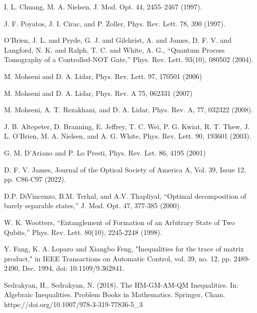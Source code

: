 \documentclass[a4paper, amsfonts, amssymb, amsmath, reprint, showkeys, nofootinbib, twoside]{revtex4-1}
\begin{document}
\begin{thebibliography}{}
I. L. Chuang, M. A. Nielsen, J. Mod. Opt. 44, 2455–2467 (1997).

J. F. Poyatos, J. I. Cirac, and P. Zoller, Phys. Rev. Lett. 78, 390 (1997).

O'Brien, J. L. and Pryde, G. J. and Gilchrist, A. and James, D. F. V. and Langford, N. K. and Ralph, T. C. and White, A. G., “Quantum Process Tomography of a Controlled-NOT Gate,” Phys. Rev. Lett. 93(10), 080502 (2004).

M. Mohseni and D. A. Lidar, Phys. Rev. Lett. 97, 170501
(2006)

M. Mohseni and D. A. Lidar, Phys. Rev. A 75, 062331 (2007)

M. Mohseni, A. T. Rezakhani, and D. A. Lidar, Phys. Rev. A, 77, 032322 (2008).

J. B. Altepeter, D. Branning, E. Jeffrey, T. C. Wei, P. G. Kwiat, R. T. Thew, J. L. O’Brien, M. A. Nielsen, and A. G. White, Phys. Rev. Lett. 90, 193601 (2003).

G. M. D’Ariano and P. Lo Presti, Phys. Rev. Let. 86, 4195 (2001)

D. F. V. James, Journal of the Optical Society of America A, Vol. 39, Issue 12, pp. C86-C97 (2022).

D.P. DiVincenzo, B.M. Terhal, and A.V. Thapliyal, “Optimal decomposition of barely separable states,” J. Mod. Opt. 47, 377-385 (2000).

W. K. Wootters, “Entanglement of Formation of an Arbitrary State of Two Qubits,” Phys. Rev. Lett. 80(10),
2245-2248 (1998).

Y. Fang, K. A. Loparo and Xiangbo Feng, "Inequalities for the trace of matrix product," in IEEE Transactions on Automatic Control, vol. 39, no. 12, pp. 2489-2490, Dec. 1994, doi: 10.1109/9.362841.

Sedrakyan, H., Sedrakyan, N. (2018). The HM-GM-AM-QM Inequalities. In: Algebraic Inequalities. Problem Books in Mathematics. Springer, Cham. https://doi.org/10.1007/978-3-319-77836-5\_3
\end{thebibliography}
\end{document}
